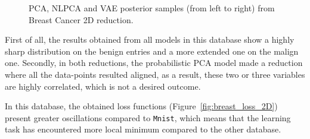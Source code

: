 \begin{figure}
  \centering
   \caption{PCA, NLPCA and VAE posterior samples (from left to right) from Breast Cancer 2D reduction.}\label{fig:breast_posterior_2D}
 \end{figure}

First of all, the results obtained from all models in this database show a highly sharp distribution on the benign entries and a more extended one on the malign one. Secondly, in both reductions, the probabilistic PCA model made a reduction where all the data-points resulted aligned, as a result, these two or three variables are highly correlated, which is not a desired outcome.

In this database, the obtained loss functions (Figure~\ref{fig:breast_loss_2D}) present greater oscillations compared to \texttt{Mnist}, which means that the learning task has encountered more local minimum compared to the other database.

